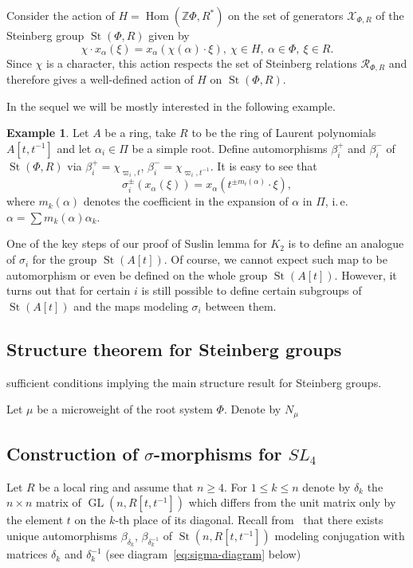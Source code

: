 \documentclass[oneside, 10pt]{amsart}
\DeclareMathOperator{\St}{St}
\DeclareMathOperator{\Hom}{Hom}
\DeclareMathOperator{\GL}{GL}
\newcommand{\ZZ}{\mathbb{Z}}
\numberwithin{equation}{section}
\numberwithin{lemma}{section}
\theoremstyle{definition}
\newtheorem{example}[lemma]{Example}
\theoremstyle{remark}
\begin{document}
Consider the action of $H=\Hom(\ZZ \Phi, R^*)$ on the set of generators $\mathcal{X}_{\Phi, R}$ of the Steinberg group $\St(\Phi, R)$ given by
\begin{equation} \chi \cdot x_\alpha(\xi) = x_\alpha(\chi(\alpha) \cdot \xi),\ \chi \in H,\ \alpha\in \Phi,\ \xi \in R. \end{equation}
Since $\chi$ is a character, this action respects the set of Steinberg relations $\mathcal{R}_{\Phi, R}$ and therefore gives a well-defined action of $H$ on $\St(\Phi, R)$.

In the sequel we will be mostly interested in the following example.
\begin{example}
Let $A$ be a ring, take $R$ to be the ring of Laurent polynomials $A[t, t^{-1}]$ and let $\alpha_i \in \Pi$ be a simple root.
Define automorphisms $\beta_i^+$ and $\beta_i^-$ of $\St(\Phi, R)$ via $\beta_i^+ = \chi_{\varpi_i, t}$, $\beta_i^- = \chi_{\varpi_i, t^{-1}}$.
It is easy to see that
\begin{equation}\label{eq:sigma_act} \sigma_i^\pm(x_\alpha(\xi)) = x_\alpha(t^{\pm m_i(\alpha)} \cdot \xi),\end{equation}
where $m_k(\alpha)$ denotes the coefficient in the expansion of $\alpha$ in $\Pi$, i.\,e. $\alpha = \sum m_k(\alpha) \alpha_k$.
\end{example}

One of the key steps of our proof of Suslin lemma for $K_2$ is to define an analogue of $\sigma_i$ for the group $\St(A[t])$.
Of course, we cannot expect such map to be automorphism or even be defined on the whole group $\St(A[t])$.
However, it turns out that for certain $i$ is still possible to define certain subgroups of $\St(A[t])$ and the maps modeling $\sigma_i$ between them.

\subsection{Structure theorem for Steinberg groups}


sufficient conditions implying the main structure result for Steinberg groups.

Let $\mu$ be a microweight of the root system $\Phi$. Denote by $N_\mu$

\subsection{Construction of \texorpdfstring{$\sigma$}{sigma}-morphisms for $SL_4$}
Let $R$ be a local ring and assume that $n\geq 4$.
For $1\leq k\leq n$ denote by $\delta_k$ the $n\times n$ matrix of $\GL(n, R[t, t^{-1}])$ which differs from the unit matrix 
 only by the element $t$ on the $k$-th place of its diagonal.
Recall from~\cite[Corollary~4]{Ka77} that there exists unique automorphisms $\beta_{\delta_k}$, $\beta_{\delta_k^{-1}}$ of $\St(n, R[t, t^{-1}])$
 modeling conjugation with matrices $\delta_k$ and $\delta_k^{-1}$ (see diagram~\eqref{eq:sigma-diagram} below)
\end{document}
